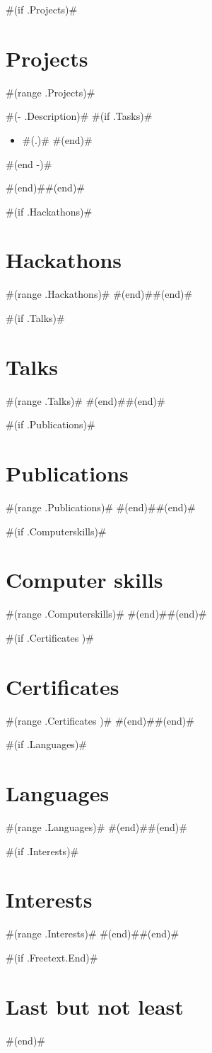 \documentclass[10pt,a4paper,sans]{moderncv}
\begin{document}
#(if .Projects)#\section{Projects}
#(range .Projects)#
{ #(- .Description)# 
  #(if .Tasks)#\begin{itemize}
    #(range .Tasks)# \item #(.)#
    #(end)#\end{itemize}
  #(end -)# }
#(end)##(end)#

#(if .Hackathons)#\section{Hackathons}
#(range .Hackathons)#
#(end)##(end)#

#(if .Talks)#\section{Talks}
#(range .Talks)#
#(end)##(end)#

#(if .Publications)#\section{Publications}
#(range .Publications)#
#(end)##(end)#

#(if .Computerskills)#\section{Computer skills}
#(range .Computerskills)#
#(end)##(end)#

#(if .Certificates )#\section{Certificates}
#(range .Certificates )#
#(end)##(end)#

#(if .Languages)#\section{Languages}
#(range .Languages)#
#(end)##(end)#

#(if .Interests)#\section{Interests}
#(range .Interests)#
#(end)##(end)#

#(if .Freetext.End)#\section{Last but not least}
#(end)#
\end{document}

